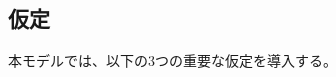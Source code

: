 \documentclass[12pt, a4paper]{article}
\theoremstyle{definition}
\theoremstyle{remark}
\theoremstyle{plain}
\begin{document}














\subsection{仮定}
本モデルでは、以下の3つの重要な仮定を導入する。
\end{document}
